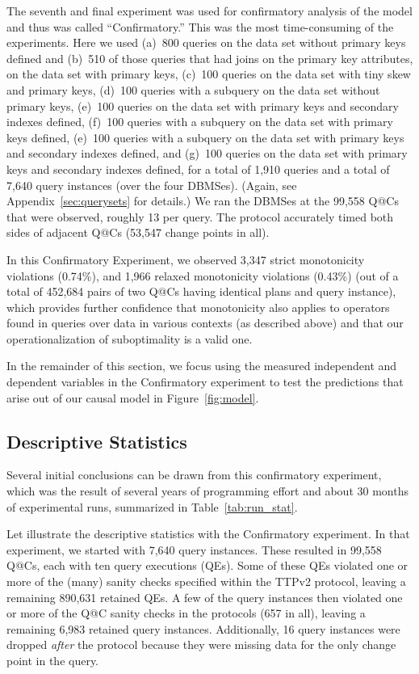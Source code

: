 \documentclass[prodmode,acmtods]{acmsmall}
\makeatletter
\def\QatC{Q{@}C}
\makeatother
\begin{document}
The seventh and final experiment was used for confirmatory analysis of the model and thus was
called ``Confirmatory.'' This was the most time-consuming of
the experiments. Here we
used (a)~800 queries on the data set without primary keys defined and (b)~510 of
those queries that had joins on the primary key attributes, on the data set
with primary keys, 
(c)~100 queries on the data set with tiny skew and primary keys,  
(d)~100 queries with a subquery on the data set without primary keys,  
(e)~100 queries on the data set with primary keys and secondary indexes defined, 
(f)~100 queries with a subquery on the data set with primary keys defined,  
(e)~100 queries with a subquery on the data set with primary keys and secondary indexes defined, and 
(g)~100 queries on the data set with primary keys and secondary indexes defined, 
for a total of 1,910 queries and a total of 7,640 query instances (over the
four \hbox{DBMSes}). (Again, see Appendix~\ref{sec:querysets} for details.)
We ran the \hbox{DBMSes} at the 99,558 {\QatC}s that were observed,
roughly 13 per query. The protocol accurately timed
both sides of adjacent {\QatC}s (53,547 change points in all).

In this Confirmatory Experiment, we observed 3,347 strict monotonicity
violations (0.74\%), and 1,966 relaxed monotonicity violations (0.43\%) (out
of a total of 452,684 pairs
of two Q@Cs having identical plans and query instance), which provides
further confidence that monotonicity also applies to operators found in
queries over data in various contexts (as described above) and that our
operationalization of suboptimality is a valid one.

In the remainder of this section, we focus using the measured independent
and dependent variables in the Confirmatory experiment
to test the predictions that arise out of our causal model in Figure~\ref{fig:model}.

\subsection{Descriptive Statistics}
Several initial conclusions can be drawn from this confirmatory experiment, which was the
result of several years of programming effort and about 30 months of
experimental runs, summarized in Table~\ref{tab:run_stat}. 

Let illustrate the descriptive statistics with the Confirmatory
experiment. In that experiment, we started with 7,640 query instances. These
resulted in 99,558 Q@Cs, each with ten query executions (QEs). Some of these
QEs violated one or more of the (many) sanity checks specified within the
TTPv2 protocol, leaving a remaining 890,631
retained QEs. A few of the query instances then violated one or more of the
Q@C sanity checks in the protocols (657 in all), leaving a remaining 6,983 retained query
instances. Additionally, 16 query instances were dropped {\em after} the
protocol because they were missing data for the only change point in the
query.
\end{document}
